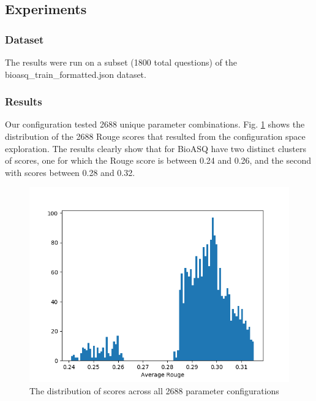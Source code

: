 \documentclass{article}
\begin{document}
    \subsection{Experiments}

        \subsubsection{Dataset}
        The results were run on a subset (1800 total questions) of the bioasq\_train\_formatted.json dataset.


    \subsubsection{Results}

    Our configuration tested 2688 unique parameter combinations.
    Fig. \ref{fig:histogram} shows the distribution of the 2688 Rouge scores that resulted from the configuration space exploration.
    The results clearly show that for BioASQ have two distinct clusters of scores, one for which the Rouge score is between 0.24 and 0.26,
    and the second with scores between 0.28 and 0.32.

    \begin{figure}[H]
        \begin{center}
            \includegraphics[width=\textwidth]{fig/hist.png}
        \end{center}
        \caption{The distribution of scores across all 2688 parameter configurations}\label{fig:histogram}
    \end{figure}
\end{document}
